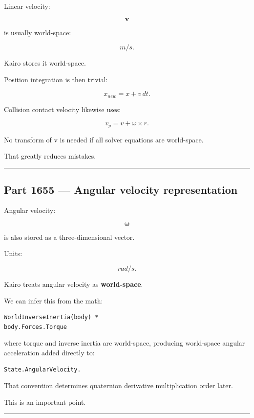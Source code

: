 Linear velocity:

\[
\mathbf v
\]

is usually world-space:

\[
m/s.
\]

Kairo stores it world-space.

Position integration is then trivial:

\[
x_{new}=x+v\,dt.
\]

Collision contact velocity likewise uses:

\[
v_p
=
v+
\omega\times r.
\]

No transform of v is needed if all solver equations are world-space.

That greatly reduces mistakes.

\begin{center}\rule{0.5\linewidth}{0.5pt}\end{center}

\subsection{Part 1655 --- Angular velocity representation}\label{06-engine-ii-ch037-part-1655-angular-velocity-representation}

Angular velocity:

\[
\boldsymbol\omega
\]

is also stored as a three-dimensional vector.

Units:

\[
rad/s.
\]

Kairo treats angular velocity as \textbf{world-space}.

We can infer this from the math:

\begin{verbatim}
WorldInverseInertia(body) *
body.Forces.Torque
\end{verbatim}

where torque and inverse inertia are world-space, producing world-space angular acceleration added directly to:

\begin{verbatim}
State.AngularVelocity.
\end{verbatim}

That convention determines quaternion derivative multiplication order later.

This is an important point.

\begin{center}\rule{0.5\linewidth}{0.5pt}\end{center}

